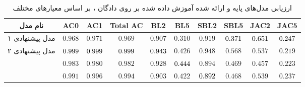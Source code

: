 \begin{table}[!htb]
	\centering
	\caption{
		ارزیابی مدل‌های پایه و ارائه شده آموزش داده شده بر روی دادگان ، بر اساس معیار‌های مختلف}
	\label{table:amazon_result}
	\small\tabcolsep=0.07cm
	\begin{tabular}{||c||c c c|c c|c c|c c||}\hline\hline نام مدل & AC0                        & AC1                        & Total AC                   & BL2                        & BL5                        & SBL2                       & SBL5                       & JAC2                       & JAC5                       \\
		\hline\hline
		مدل پیشنهادی ۱
		                                               & $0.968$                    & $0.971$                    & $0.969$                    & $0.907$                    & $0.310$                    & $0.919$                    & $\cellcolor{gray!25}0.371$ & $\cellcolor{gray!25}0.651$ & $\cellcolor{gray!25}0.247$ \\
		\hline
		مدل پیشنهادی ۲
		                                               & $\cellcolor{gray!25}0.999$ & $\cellcolor{gray!25}0.999$ & $\cellcolor{gray!25}0.999$ & $\cellcolor{gray!25}0.943$ & $0.426$                    & $0.948$                    & $0.568$                    & $0.537$                    & $0.219$                    \\
		\hline
		\towardctg{}                                   & $0.983$                    & $0.980$                    & $0.982$                    & $0.928$                    & $\cellcolor{gray!25}0.444$ & $0.894$                    & $0.469$                    & $0.457$                    & $0.223$                    \\
		\hline
		\sentigan{}                                    & $0.991$                    & $0.996$                    & $0.994$                    & $0.903$                    & $0.422$                    & $\cellcolor{gray!25}0.892$ & $0.468$                    & $0.539$                    & $0.237$                    \\
		\hline
		\hline\end{tabular}\normalsize
\end{table}

